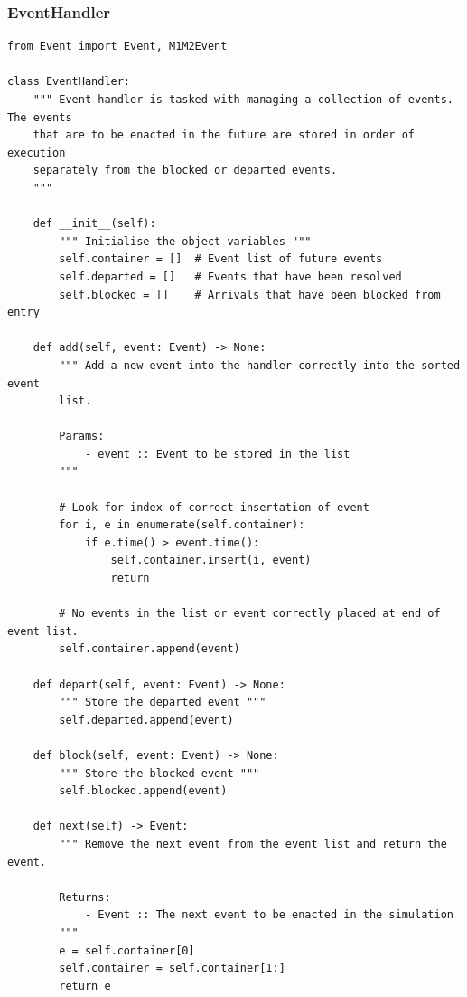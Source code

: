 \documentclass{ecmm427_assignment}
\begin{document}
\subsubsection{EventHandler}
\begin{verbatim}
from Event import Event, M1M2Event

class EventHandler:
    """ Event handler is tasked with managing a collection of events. The events
    that are to be enacted in the future are stored in order of execution
    separately from the blocked or departed events.
    """

    def __init__(self):
        """ Initialise the object variables """
        self.container = []  # Event list of future events
        self.departed = []   # Events that have been resolved
        self.blocked = []    # Arrivals that have been blocked from entry

    def add(self, event: Event) -> None:
        """ Add a new event into the handler correctly into the sorted event
        list.

        Params:
            - event :: Event to be stored in the list
        """

        # Look for index of correct insertation of event
        for i, e in enumerate(self.container):
            if e.time() > event.time():
                self.container.insert(i, event)
                return
        
        # No events in the list or event correctly placed at end of event list.
        self.container.append(event)
    
    def depart(self, event: Event) -> None:
        """ Store the departed event """
        self.departed.append(event)

    def block(self, event: Event) -> None:
        """ Store the blocked event """
        self.blocked.append(event)

    def next(self) -> Event:
        """ Remove the next event from the event list and return the event.

        Returns:
            - Event :: The next event to be enacted in the simulation
        """
        e = self.container[0]
        self.container = self.container[1:]
        return e
\end{verbatim}
\end{document}
